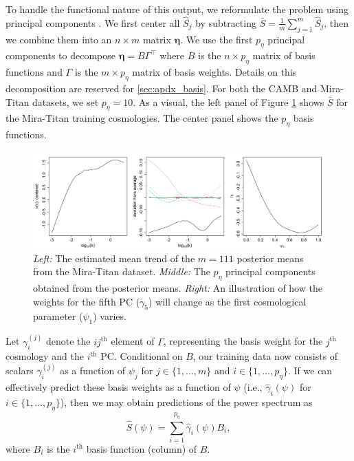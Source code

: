 \documentclass[11pt]{article}
\begin{document}
To handle the functional nature of this output, we reformulate the problem using principal
components \citep[PCs; e.g.,][]{banerjee2014linear}.  
We first center all $\hat{S}_j$ by subtracting $\bar{S} = \frac{1}{m}\sum_{j=1}^{m} \hat{S}_j$, 
then we combine them into an $n\times m$ matrix $\boldsymbol\eta$.  We use the first $p_\eta$ 
principal components to decompose $\boldsymbol\eta = B\Gamma^\top$ where $B$ is the 
$n\times p_\eta$ matrix of basis functions and $\Gamma$ is the $m\times p_\eta$ matrix of basis weights.  
Details on this decomposition are reserved for \ref{sec:apdx_basis}. For both the CAMB and Mira-Titan 
datasets, we set $p_\eta=10$. As a visual, the left panel of Figure \ref{fig:mean_PCs_oneW} shows 
$\bar{S}$ for the Mira-Titan training cosmologies.  The center panel shows the $p_\eta$ basis functions.

\begin{figure}
    \centering
    \includegraphics[width=\textwidth]{mean_PCs_oneW.jpeg}
    \caption{{\it Left:} The estimated mean trend of the $m=111$ posterior means from 
    the Mira-Titan dataset. {\it Middle:} The $p_\eta$ principal components obtained from 
    the posterior means. {\it Right:} An 
    illustration of how the weights for the fifth PC ($\gamma_5$) will change as the first 
    cosmological parameter ($\psi_1$) varies.}
    \label{fig:mean_PCs_oneW}
\end{figure}

 
Let $\gamma_i^{(j)}$ denote the $ij^\textrm{th}$ element of $\Gamma$, representing the basis weight for the 
$j^\textrm{th}$ cosmology and the $i^\textrm{th}$ PC.
Conditional on $B$, our training data now consists of scalars $\gamma_i^{(j)}$ as a function of $\psi_j$
for $j \in \{1,\ldots,m\}$ and $i \in \{1,\ldots,p_\eta\}$.  If we can effectively predict these basis weights
as a function of $\psi$ (i.e., $\hat{\gamma}_i(\psi)$ for $i \in \{1,\ldots,p_\eta\}$), then we may obtain predictions 
of the power spectrum as
\begin{equation}\label{eq:spred}
\hat{S}(\psi) = \sum_{i=1}^{p_\eta} \hat{\gamma}_i(\psi) B_i,
\end{equation}
where $B_i$ is the $i^\textrm{th}$ basis function (column) of $B$.
\end{document}
